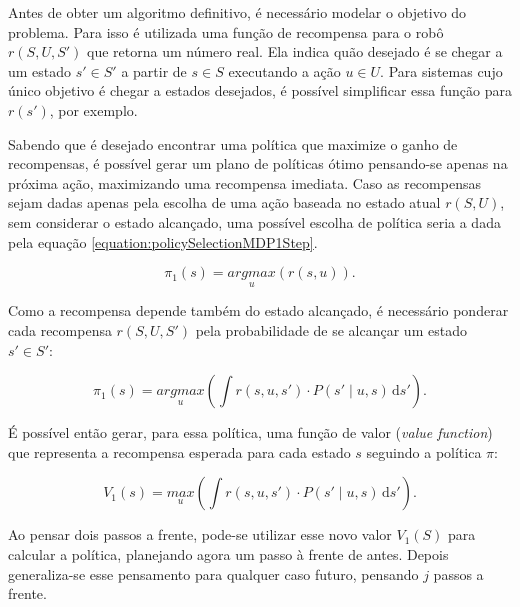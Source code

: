Antes de obter um algoritmo definitivo, é necessário modelar o objetivo do problema. Para isso é utilizada uma função de recompensa para o robô $ r \left( S, U, S' \right) $ que retorna um número real. Ela indica quão desejado é se chegar a um estado $ s' \in S' $ a partir de $ s \in S $ executando a ação $ u \in U $. Para sistemas cujo único objetivo é chegar a estados desejados, é possível simplificar essa função para $ r \left( s' \right) $, por exemplo.

Sabendo que é desejado encontrar uma política que maximize o ganho de recompensas, é possível gerar um plano de políticas ótimo pensando-se apenas na próxima ação, maximizando uma recompensa imediata. Caso as recompensas sejam dadas apenas pela escolha de uma ação baseada no estado atual $ r \left( S, U \right) $, sem considerar o estado alcançado, uma possível escolha de política seria a dada pela equação \ref{equation:policySelectionMDP1Step}.

\begin{equation} \label{equation:policySelectionMDP1Step}
    \pi_1 \left( s \right) = \underset{u}{argmax} \left( r \left( s, u \right) \right).
\end{equation}

Como a recompensa depende também do estado alcançado, é necessário ponderar cada recompensa $ r \left( S, U, S' \right) $ pela probabilidade de se alcançar um estado $ s' \in S' $:

\begin{equation}
    \pi_1 \left( s \right) = \underset{u}{argmax} \left( \int \! r \left( s, u, s' \right) \cdot P \left( s' \mid u, s \right) \, \mathrm{d}s' \right).
\end{equation}

É possível então gerar, para essa política, uma função de valor (\textit{value function}) que representa a recompensa esperada para cada estado $ s $ seguindo a política $ \pi $:

\begin{equation}
    V_1 \left( s \right) = \underset{u}{max} \left( \int \! r \left( s, u, s' \right) \cdot P \left( s' \mid u, s \right) \, \mathrm{d}s' \right).
\end{equation}

Ao pensar dois passos a frente, pode-se utilizar esse novo valor $ V_1 \left( S \right) $ para calcular a política, planejando agora um passo à frente de antes. Depois generaliza-se esse pensamento para qualquer caso futuro, pensando $ j $ passos a frente.

